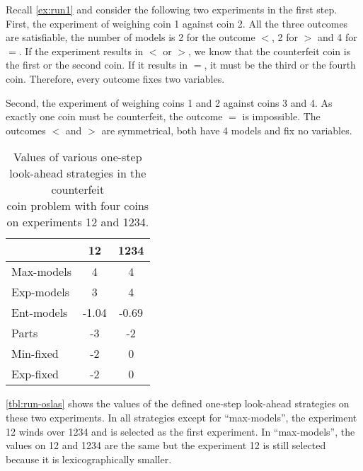 \begin{example}
Recall \autoref{ex:run1} and consider the following two experiments in the first step.
First, the experiment of weighing coin 1 against coin 2.
All the three outcomes are satisfiable, the number of models is
  2 for the outcome $<$, 2 for $>$ and 4 for $=$.
If the experiment results in $<$ or $>$, we know that the counterfeit coin
is the first or the second coin. If it results in $=$, it must be the third or the fourth coin.
Therefore, every outcome fixes two variables.

Second, the experiment of weighing coins 1 and 2 against coins 3 and 4.
As exactly one coin must be counterfeit, the outcome $=$ is impossible.
The outcomes $<$ and $>$ are symmetrical, both have 4 models and fix no variables.

\begin{table}[!ht]
\begin{center}
\begin{tabular}{l|cc}
& 12 & 1234 \\\hline
Max-models & 4 & 4 \\
Exp-models & 3 & 4 \\
Ent-models & -1.04 & -0.69 \\
Parts & -3 & -2 \\
Min-fixed & -2 & 0 \\
Exp-fixed & -2 & 0 \\
\end{tabular}
\caption{Values of various one-step look-ahead strategies in the counterfeit \\
  coin problem with four coins on experiments 12 and 1234.}
\label{tbl:run-oslas}
\end{center}
\end{table}

\autoref{tbl:run-oslas} shows the values of the defined one-step look-ahead
  strategies on these two experiments.
In all strategies except for ``max-models'', the experiment 12 winds over 1234
  and is selected as the first experiment.
In ``max-models'', the values on 12 and 1234 are the same but the experiment
  12 is still selected because it is lexicographically smaller. \eqed
\end{example}


